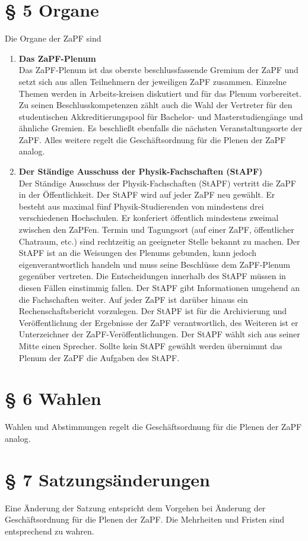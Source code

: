 \section*{§ 5 Organe}
Die Organe der ZaPF sind
\begin{enumerate}
\item{\textbf{Das ZaPF-Plenum}\\
Das ZaPF-Plenum ist das oberste beschlussfassende Gremium der ZaPF und setzt sich aus allen Teilnehmern der jeweiligen ZaPF
zusammen. Einzelne Themen werden in Arbeits-kreisen diskutiert und für das Plenum vorbereitet. Zu seinen Beschlusskompetenzen
zählt auch die Wahl der Vertreter für den studentischen Akkreditierungspool für Bachelor- und Masterstudiengänge und ähnliche
Gremien. Es beschließt ebenfalls die nächsten Veranstaltungsorte der ZaPF. Alles weitere regelt die Geschäftsordnung für die Plenen der
ZaPF analog.}
\item{\textbf{Der Ständige Ausschuss der Physik-Fachschaften (StAPF)}\\
Der Ständige Ausschuss der Physik-Fachschaften (StAPF) vertritt die
ZaPF in der Öffentlichkeit. Der StAPF wird auf jeder ZaPF neu
gewählt. Er besteht aus maximal fünf Physik-Studierenden von
mindestens drei verschiedenen Hochschulen. Er konferiert öffentlich
mindestens zweimal zwischen den ZaPFen. Termin und Tagungsort (auf
einer ZaPF, öffentlicher Chatraum, etc.) sind rechtzeitig an
geeigneter Stelle bekannt zu machen. Der StAPF ist an die Weisungen
des Plenums gebunden, kann jedoch eigenverantwortlich handeln und
muss seine Beschlüsse dem ZaPF-Plenum gegenüber vertreten. Die
Entscheidungen innerhalb des StAPF müssen in diesen Fällen
einstimmig fallen. Der StAPF gibt Informationen umgehend an die
Fachschaften weiter. Auf jeder ZaPF ist darüber hinaus ein
Rechenschaftsbericht vorzulegen. Der StAPF ist für die Archivierung
und Veröffentlichung der Ergebnisse der ZaPF verantwortlich, des
Weiteren ist er Unterzeichner der ZaPF-Veröffentlichungen. Der StAPF
wählt sich aus seiner Mitte einen Sprecher. Sollte kein StAPF
gewählt werden übernimmt das Plenum der ZaPF die Aufgaben des StAPF.}
\end{enumerate}
\section*{§ 6 Wahlen}
Wahlen und Abstimmungen regelt die Geschäftsordnung für die Plenen der ZaPF analog.

\section*{§ 7 Satzungsänderungen}
Eine Änderung der Satzung entspricht dem Vorgehen bei Änderung der Geschäftsordnung für die Plenen der ZaPF.
Die Mehrheiten und Fristen sind entsprechend zu wahren.

